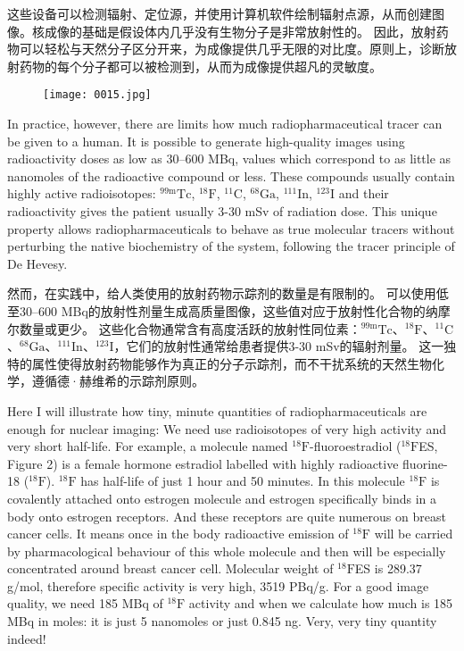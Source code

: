\documentclass[dvipsnames, svgnames,a4paper,11pt]{article}
\begin{document}
这些设备可以检测辐射、定位源，并使用计算机软件绘制辐射点源，从而创建图像。核成像的基础是假设体内几乎没有生物分子是非常放射性的。  因此，放射药物可以轻松与天然分子区分开来，为成像提供几乎无限的对比度。原则上，诊断放射药物的每个分子都可以被检测到，从而为成像提供超凡的灵敏度。

\begin{figure}[h]
      \centering
      \texttt{[image: 0015.jpg]}
       \label{fig1}
  \end{figure}

In practice, however, there are limits how much radiopharmaceutical tracer can be given to a human.  It is possible to generate high-quality images using radioactivity doses as low as 30–600 MBq, values which correspond to as little as nanomoles of the radioactive compound or less.  These compounds usually contain highly active radioisotopes: ${}^\text{99m}\text{Tc}$, ${}^{18}\text{F}$, ${}^{11}\text{C}$, ${}^\text{68}\text{Ga}$, ${}^\text{111}\text{In}$, ${}^\text{123}\text{I}$ and their radioactivity gives the patient usually 3-30 mSv of radiation dose.  This unique property allows radiopharmaceuticals to behave as true molecular tracers without perturbing the native biochemistry of the system, following the tracer principle of De Hevesy.

然而，在实践中，给人类使用的放射药物示踪剂的数量是有限制的。  可以使用低至30–600 MBq的放射性剂量生成高质量图像，这些值对应于放射性化合物的纳摩尔数量或更少。 这些化合物通常含有高度活跃的放射性同位素：${}^\text{99m}\text{Tc}$、${}^{18}\text{F}$、${}^{11}\text{C}$、${}^\text{68}\text{Ga}$、${}^\text{111}\text{In}$、${}^\text{123}\text{I}$，它们的放射性通常给患者提供3-30 mSv的辐射剂量。  这一独特的属性使得放射药物能够作为真正的分子示踪剂，而不干扰系统的天然生物化学，遵循德·赫维希的示踪剂原则。

Here I will illustrate how tiny, minute quantities of radiopharmaceuticals are enough for nuclear imaging:
We need use radioisotopes of very high activity and very short half-life. For example, a molecule named ${}^{18}\text{F}$-fluoroestradiol (${}^{18}\text{F}$ES, Figure 2) is a female hormone estradiol labelled with highly radioactive fluorine-18 (${}^{18}\text{F}$). ${}^{18}\text{F}$ has half-life of just 1 hour and 50 minutes.  In this molecule ${}^{18}\text{F}$ is covalently attached onto estrogen molecule and estrogen specifically binds in a body onto estrogen receptors. And these receptors are quite numerous on breast cancer cells.  It means once in the body radioactive emission of ${}^{18}\text{F}$ will be carried by pharmacological behaviour of this whole molecule and then will be especially concentrated around breast cancer cell.  Molecular weight of ${}^{18}\text{F}$ES is 289.37 g/mol, therefore specific activity is very high, 3519 PBq/g.  For a good image quality, we need 185 MBq of ${}^{18}\text{F}$ activity and when we calculate how much is 185 MBq in moles: it is just 5 nanomoles or just 0.845 ng.  Very, very tiny quantity indeed!
\end{document}

